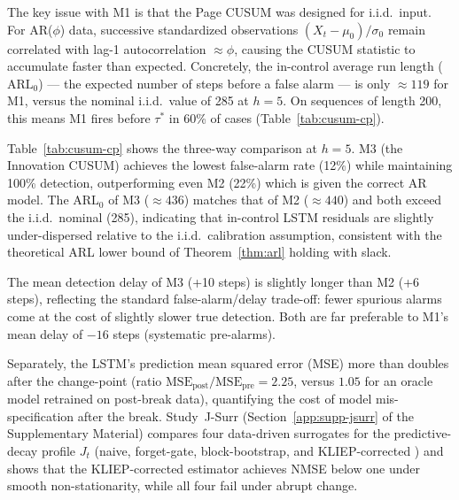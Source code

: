 \documentclass[bj,authoryear]{imsart}
\theoremstyle{plain}
\theoremstyle{definition}
\begin{document}
The key issue with M1 is that the Page CUSUM was designed for i.i.d.\ input.
For AR($\phi$) data, successive standardized observations $(X_t - \mu_0)/\sigma_0$
remain correlated with lag-1 autocorrelation $\approx \phi$, causing the
CUSUM statistic to accumulate faster than expected.
Concretely, the in-control average run length (\(\mathrm{ARL}_0\)) --- the
expected number of steps before a false alarm --- is only $\approx 119$ for M1,
versus the nominal i.i.d.\ value of 285 at $h=5$.
On sequences of length 200, this means M1 fires before $\tau^*$ in 60\% of
cases (Table~\ref{tab:cusum-cp}).

Table~\ref{tab:cusum-cp} shows the three-way comparison at $h = 5$.
M3 (the Innovation CUSUM) achieves the lowest false-alarm rate (12\%) while maintaining
100\% detection, outperforming even M2 (22\%) which is given the correct AR
model.  The $\mathrm{ARL}_0$ of M3 ($\approx 436$) matches that of M2
($\approx 440$) and both exceed the i.i.d.\ nominal (285), indicating that in-control LSTM residuals are slightly under-dispersed relative to the i.i.d.\ calibration assumption, consistent with the theoretical ARL lower bound of Theorem~\ref{thm:arl} holding with slack.

The mean detection delay of M3 (+10 steps) is slightly longer than M2 (+6 steps),
reflecting the standard false-alarm/delay trade-off: fewer spurious alarms
come at the cost of slightly slower true detection.  Both are far preferable
to M1's mean delay of $-16$ steps (systematic pre-alarms).

Separately, the LSTM's prediction mean squared error (MSE) more than doubles
after the change-point (ratio $\mathrm{MSE}_{\mathrm{post}}/\mathrm{MSE}_{\mathrm{pre}}
= 2.25$, versus $1.05$ for an oracle model retrained on post-break data),
quantifying the cost of model mis-specification after the break.
Study~J-Surr (Section~\ref{app:supp-jsurr} of the Supplementary Material) compares four data-driven surrogates
for the predictive-decay profile $J_t$ (naive, forget-gate, block-bootstrap,
and KLIEP-corrected \citealt{chang2026jrssb}) and shows that the
KLIEP-corrected estimator achieves NMSE below one under smooth
non-stationarity, while all four fail under abrupt change.
\end{document}

